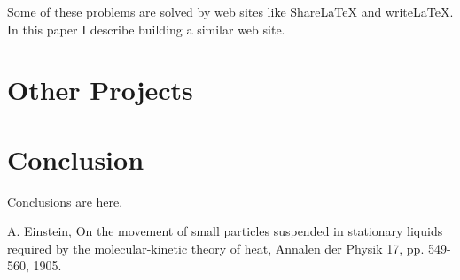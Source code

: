 \documentclass{llncs}
\begin{document}
Some of these problems are solved by web sites like \mbox{ShareLaTeX} and \mbox{writeLaTeX}. In this paper I describe building a similar web site.

\section{Other Projects}

\section{Conclusion}

Conclusions are here.

\begin{thebibliography}{1}

A. Einstein, On the movement of small particles suspended in stationary liquids required by the molecular-kinetic theory of heat, Annalen der Physik 17, pp. 549-560, 1905.

\end{thebibliography}
\end{document}
